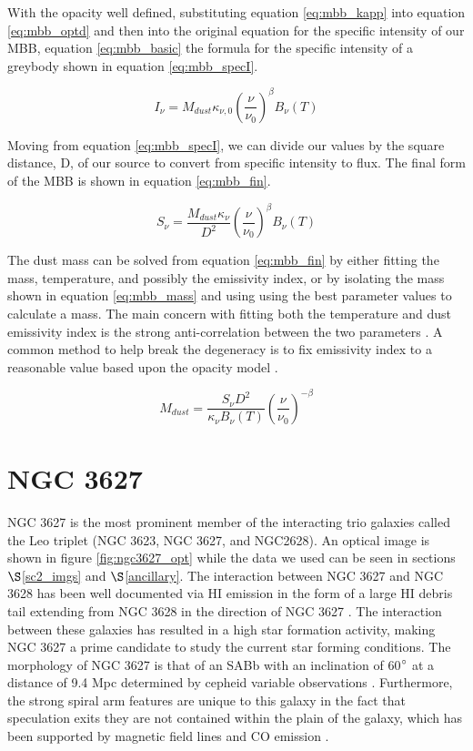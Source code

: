 With the opacity well defined, substituting equation \ref{eq:mbb_kapp} into equation \ref{eq:mbb_optd} and then into the original equation for the specific intensity of our MBB, equation \ref{eq:mbb_basic} the formula for the specific intensity of a greybody shown in equation \ref{eq:mbb_specI}.

\begin{equation}\label{eq:mbb_specI}
  I_\nu=M_{dust}\kappa_{\nu,0}\left(\frac{\nu}{\nu_0}\right)^\beta B_\nu\left(T\right)
\end{equation}

Moving from equation \ref{eq:mbb_specI}, we can divide our values by the square distance, D, of our source to convert from specific intensity to flux.  The final form of the MBB is shown in equation \ref{eq:mbb_fin}.

\begin{equation}\label{eq:mbb_fin}
  S_\nu=\frac{M_{dust}\kappa_\nu}{D^2}\left(\frac{\nu}{\nu_0}\right)^\beta B_\nu\left(T\right)
\end{equation}

The dust mass can be solved from equation \ref{eq:mbb_fin} by either fitting the mass, temperature, and possibly the emissivity index, or by isolating the mass shown in equation \ref{eq:mbb_mass} and using using the best parameter values to calculate a mass.  The main concern with fitting both the temperature and dust emissivity index is the strong anti-correlation between the two parameters \citep{galametz2012,tabatabaei2014}.  A common method to help break the degeneracy is to fix emissivity index to a reasonable value based upon the opacity model \citep{tabatabaei2014}.

\begin{equation}\label{eq:mbb_mass}
  M_{dust} = \frac{S_\nu D^2}{\kappa_\nu B_\nu\left(T\right)}\left(\frac{\nu}{\nu_0}\right)^{-\beta}
\end{equation}

\section{NGC 3627}
NGC 3627 is the most prominent member of the interacting trio galaxies called the Leo triplet (NGC 3623, NGC 3627,  and NGC2628).  An optical image is shown in figure \ref{fig:ngc3627_opt} while the data we used can be seen in sections $\S$\ref{sc2_imgs} and $\S$\ref{ancillary}.  The interaction between NGC 3627 and NGC 3628 has been well documented via HI emission in the form of a large HI debris tail extending from NGC 3628 in the direction of NGC 3627 \citep{rots1978,haynes1979}.  The interaction between these galaxies has resulted in a high star formation activity, making NGC 3627 a prime candidate to study the current star forming conditions.  The morphology of NGC 3627 is that of an SABb with an inclination of 60$\degree$ \citep{reuter1996} at a distance of 9.4 Mpc determined by cepheid variable observations \citep{kennicutt2011}.  Furthermore, the strong spiral arm features are unique to this galaxy in the fact that speculation exits they are not contained within the plain of the galaxy, which has been supported by magnetic field lines \citep{soida2001} and CO emission \citep{dumke2011}.

